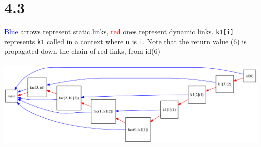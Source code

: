 \section{4.3}
\textcolor{blue}{Blue} arrows represent static links, \textcolor{red}{red} ones represent dynamic links. \texttt{k1[i]} represents \texttt{k1} called in a context where \texttt{n} is \texttt{i}. Note that the return value (6) is propagated down the chain of red links, from id(6)\\ \\
\includegraphics[width=\linewidth]{ex3.png}

